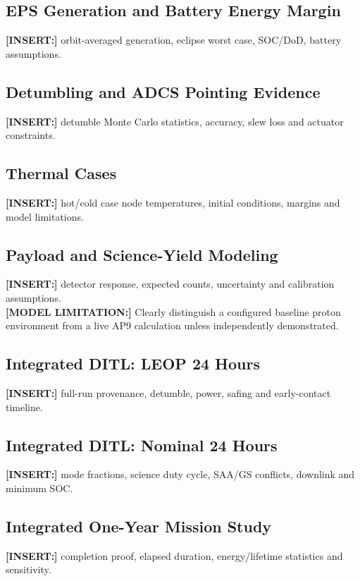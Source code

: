 \subsection{EPS Generation and Battery Energy Margin}\label{sec:sim-power}
\textbf{[INSERT:]} orbit-averaged generation, eclipse worst case, SOC/DoD, battery assumptions.

\subsection{Detumbling and ADCS Pointing Evidence}\label{sec:sim-adcs}
\textbf{[INSERT:]} detumble Monte Carlo statistics, accuracy, slew loss and actuator constraints.

\subsection{Thermal Cases}\label{sec:sim-thermal}
\textbf{[INSERT:]} hot/cold case node temperatures, initial conditions, margins and model limitations.

\subsection{Payload and Science-Yield Modeling}\label{sec:sim-payload}
\textbf{[INSERT:]} detector response, expected counts, uncertainty and calibration assumptions. \\
\textbf{[MODEL LIMITATION:]} Clearly distinguish a configured baseline proton environment from a live AP9 calculation unless independently demonstrated.

\subsection{Integrated DITL: LEOP 24 Hours}\label{sec:sim-leop}
\textbf{[INSERT:]} full-run provenance, detumble, power, safing and early-contact timeline.

\subsection{Integrated DITL: Nominal 24 Hours}\label{sec:sim-nominal}
\textbf{[INSERT:]} mode fractions, science duty cycle, SAA/GS conflicts, downlink and minimum SOC.

\subsection{Integrated One-Year Mission Study}\label{sec:sim-annual}
\textbf{[INSERT:]} completion proof, elapsed duration, energy/lifetime statistics and sensitivity.

